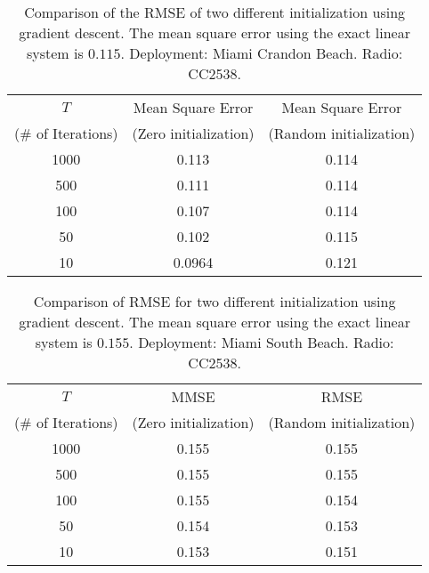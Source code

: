 \begin{table}[h!]
    \centering
    \caption{Comparison of the RMSE of two different initialization using gradient descent. The mean square error using the exact linear system is $0.115$. Deployment: Miami Crandon Beach. Radio: CC2538.}
    \label{tab:mse_comparison_cb}
    \begin{tabular}{|c|c|c|}
        \hline
        $T$ & Mean Square Error  & Mean Square Error  \\ 
         (\# of Iterations) & (Zero initialization) & (Random initialization) \\ \hline
        1000 & 0.113 & 0.114 \\ \hline
        500  & 0.111 & 0.114 \\ \hline
        100  & 0.107 & 0.114 \\ \hline
        50   & 0.102 & 0.115 \\ \hline
        10   & 0.0964 & 0.121 \\ \hline
  \end{tabular}
\end{table}

   \begin{table}[h!]
    \centering
    \caption{Comparison of RMSE for two different initialization using gradient descent. The mean square error using the exact linear system is $0.155$. Deployment: Miami South Beach. Radio: CC2538.}
    \label{tab:mse_comparison_sb}
    \begin{tabular}{|c|c|c|}
        \hline
        $T$ & MMSE  & RMSE  \\ 
         (\# of Iterations) & (Zero initialization) & (Random initialization) \\ \hline     
        1000 & 0.155 & 0.155 \\ \hline
        500  & 0.155 & 0.155 \\ \hline
        100  & 0.155 & 0.154 \\ \hline
        50   & 0.154 & 0.153 \\ \hline
        10   & 0.153 & 0.151 \\ \hline
    \end{tabular}
\end{table}

